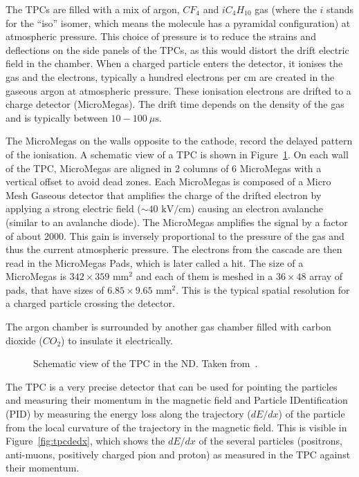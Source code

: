 The \Glspl{TPC} are filled with a mix of argon, $CF_4$ and
$i C_4H_{10}$ gas (where the $i$ stands for the ``iso'' isomer, which
means the molecule has a pyramidal configuration) at atmospheric
pressure.  This choice of pressure is to reduce the strains and
deflections on the side panels of the \Glspl{TPC}, as this would
distort the drift electric field in the chamber.  When a charged
particle enters the detector, it ionises the gas and the electrons,
typically a hundred electrons per cm are created in the gaseous argon
at atmospheric pressure. These ionisation electrons are drifted to a
charge detector (MicroMegas).  The drift time depends on the density
of the gas and is typically between $10-100~\mu\text{s}$.

The MicroMegas on the walls opposite to the cathode, record the
delayed pattern of the ionisation. A schematic view of a \Gls{TPC} is
shown in Figure~\ref{fig:tpc}. On each wall of the \Gls{TPC},
MicroMegas are aligned in 2 columns of 6 MicroMegas with a vertical
offset to avoid dead zones.  Each MicroMegas is composed of a Micro
Mesh Gaseous detector that amplifies the charge of the drifted
electron by applying a strong electric field ($\sim40\text{~kV/cm}$)
causing an electron avalanche (similar to an avalanche diode). The
MicroMegas amplifies the signal by a factor of about 2000. This gain
is inversely proportional to the pressure of the gas and thus the
current atmospheric pressure. The electrons from the cascade are then
read in the MicroMegas Pads, which is later called a hit. The size of
a MicroMegas is $342 \times 359 \text{~mm}^2$ and each of them is
meshed in a $36 \times 48$ array of pads, that have sizes of
$6.85 \times 9.65\text{~mm}^2$. This is the typical spatial resolution
for a charged particle crossing the detector.

The argon chamber is surrounded by another gas chamber filled with
carbon dioxide ($CO_2$) to insulate it electrically.

\begin{figure}[ht]
  \center
  \caption[Schematic view of the TPC in the ND280]{Schematic view of
    the \Gls{TPC} in the \Gls{ND}. Taken from~\cite{TPC}.}
  \label{fig:tpc}
\end{figure}

The \Gls{TPC} is a very precise detector that can be used for pointing
the particles and measuring their momentum in the magnetic field and
Particle IDentification (\Gls{PID}) by measuring the energy loss along
the trajectory ($dE/dx$) of the particle from the local curvature of
the trajectory in the magnetic field. This is visible in
Figure~\ref{fig:tpcdedx}, which shows the $dE/dx$ of the several
particles (positrons, anti-muons, positively charged pion and proton)
as measured in the \Gls{TPC} against their momentum.

